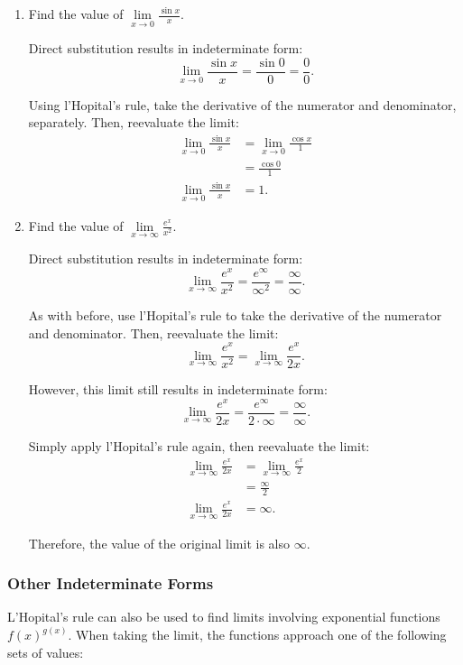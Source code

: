 \begin{enumerate}
	\item Find the value of $\lim \limits_{x \to 0} \frac{\sin x}{x}$.

	Direct substitution results in indeterminate form:
	\[ \lim_{x \to 0} \frac{\sin x}{x} = \frac{\sin 0}{0} = \frac{0}{0}. \]

	Using l'Hopital's rule, take the derivative of the numerator and denominator, separately. Then, reevaluate the limit:
	\begin{align*}
		\lim_{x \to 0} \frac{\sin x}{x} &= \lim_{x \to 0} \frac{\cos x}{1} \\[5pt]
		&= \frac{\cos 0}{1} \\[5pt]
		\lim_{x \to 0} \frac{\sin x}{x} &= 1.
	\end{align*}

	\item Find the value of $\lim \limits_{x \to \infty} \frac{e^x}{x^2}$.

	Direct substitution results in indeterminate form:
	\[ \lim_{x \to \infty} \frac{e^x}{x^2} = \frac{e^\infty}{\infty^2} = \frac{\infty}{\infty}. \]

	As with before, use l'Hopital's rule to take the derivative of the numerator and denominator. Then, reevaluate the limit:
	\[ \lim_{x \to \infty} \frac{e^x}{x^2} = \lim_{x \to \infty} \frac{e^x}{2x}. \]

	However, this limit still results in indeterminate form:
	\[ \lim_{x \to \infty} \frac{e^x}{2x} = \frac{e^\infty}{2 \cdot \infty} = \frac{\infty}{\infty}. \]

	Simply apply l'Hopital's rule again, then reevaluate the limit:
	\begin{align*}
		\lim_{x \to \infty} \frac{e^x}{2x} &= \lim_{x \to \infty} \frac{e^x}{2} \\[5pt]
		&= \frac{\infty}{2} \\[5pt]
		\lim_{x \to \infty} \frac{e^x}{2x} &= \infty.
	\end{align*}

	Therefore, the value of the original limit is also $\infty$.
\end{enumerate}

\subsubsection{Other Indeterminate Forms}
L'Hopital's rule can also be used to find limits involving exponential functions $f(x)^{g(x)}$. When taking the limit, the functions approach one of the following sets of values:

